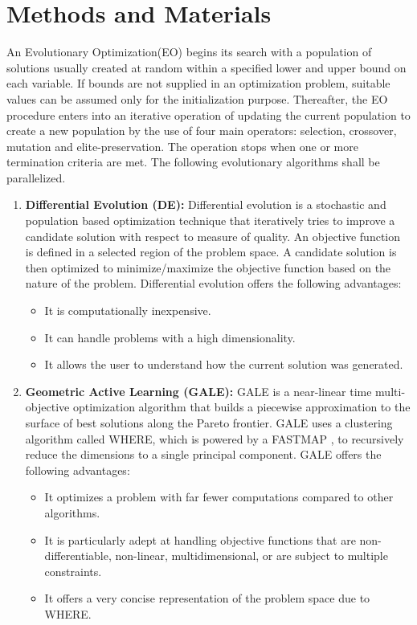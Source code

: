 \documentclass[conference]{IEEEtran}
\begin{document}
\section{Methods and Materials}
\label{algos}

An Evolutionary Optimization(EO) begins its search with a population of solutions usually created at random within a specified lower and upper bound on each variable. If bounds are not supplied in an optimization problem, suitable values can be assumed only for the initialization purpose. Thereafter, the EO procedure enters into an iterative operation of updating the current population to create a new population by the use of four main operators: selection, crossover, mutation and elite-preservation. The operation stops when one or more termination criteria are met. The following evolutionary algorithms shall be parallelized.

\begin{enumerate}
\item \textbf{Differential Evolution (DE):} Differential evolution is a stochastic and population based optimization technique that iteratively tries to improve a candidate solution with respect to measure of quality. An objective function is defined in a selected region of the problem space. A candidate solution is then optimized to minimize/maximize the objective function based on the nature of the problem. Differential evolution offers the following advantages:

\begin{itemize}
\item It is computationally inexpensive.
\item It can handle problems with a high dimensionality. 
\item It allows the user to understand how the current solution was generated.
\end{itemize}

\item \textbf{Geometric Active Learning (GALE):} GALE is a near-linear time multi-objective optimization algorithm that builds a piecewise approximation to the surface of best solutions along the Pareto frontier. GALE uses a clustering algorithm called WHERE, which is powered by a FASTMAP \cite{faloutsos95}, to recursively reduce the dimensions to a single principal component. GALE offers the following advantages:

\begin{itemize}
\item It optimizes a problem with far fewer computations compared to other algorithms.
\item It is particularly adept at handling objective functions that are non-differentiable, non-linear, multidimensional, or are subject to multiple constraints.
\item It offers a very concise representation of the problem space due to WHERE.
\end{itemize}
\end{enumerate}
\end{document}
